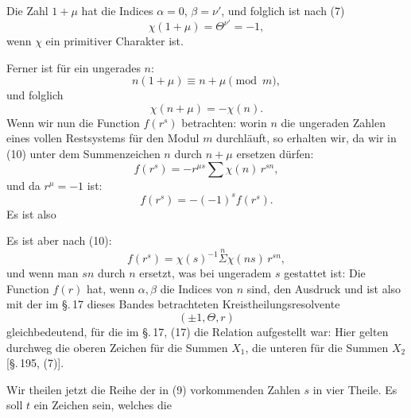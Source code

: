 
Die Zahl $1 + \mu$ hat die Indices $\alpha = 0$, $\beta = \nu'$, und
folglich ist nach (7)
\[
\chi(1+\mu) = \Theta^{\nu'} = -1,
\]
wenn $\chi$ ein primitiver Charakter ist.

Ferner ist f\"ur ein ungerades $n$:
\[
n(1+\mu) \equiv n + \mu \pmod{m},
\]
und folglich
\[
\chi(n+\mu) = -\chi(n).
\]
Wenn wir nun die Function $f(r^s)$ betrachten:
worin $n$ die ungeraden Zahlen eines vollen Restsystems f\"ur den Modul
$m$ durchl\"auft, so erhalten wir, da wir in (10) unter dem
Summenzeichen $n$ durch $n+\mu$ ersetzen d\"urfen:
\[
f(r^s) = -r^{\mu s} \sum \chi(n)\, r^{sn},
\]
und da $r^\mu = -1$ ist:
\[
f(r^s) = -(-1)^s f(r^s).
\]
Es ist also

Es ist aber nach (10):
\[
f(r^s) = \chi(s)^{-1} \overset{n}{\Sigma} \chi(ns)\, r^{sn},
\]
und wenn man $sn$ durch $n$ ersetzt, was bei ungeradem $s$ gestattet
ist:
Die Function $f(r)$ hat, wenn $\alpha, \beta$ die Indices von $n$ sind,
den Ausdruck
und ist also mit der im \S.\,17 dieses Bandes betrachteten
Kreistheilungsresolvente
\[
(\pm 1, \Theta, r)
\]
gleichbedeutend, f\"ur die im \S.\,17, (17) die Relation aufgestellt
war:
Hier gelten durchweg die oberen Zeichen f\"ur die Summen $X_1$, die
unteren f\"ur die Summen $X_2$ [\S.\,195, (7)].

Wir theilen jetzt die Reihe der in (9) vorkommenden Zahlen $s$ in vier
Theile. Es soll $t$ ein Zeichen sein, welches die
